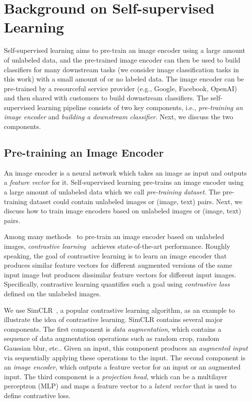 \section{Background on Self-supervised Learning}
\label{sec:background}
Self-supervised learning aims to pre-train an image encoder using a large amount of unlabeled data, and the pre-trained image encoder can then be used to build  classifiers for many downstream tasks (we consider image classification tasks in this work) with a small amount of or no labeled data. 
The image encoder can be pre-trained by a  resourceful service provider (e.g., Google, Facebook, OpenAI) and then shared with customers to build downstream classifiers. 
The self-supervised learning pipeline consists of two key components, i.e., \emph{pre-training an image encoder} and \emph{building a downstream classifier}. Next, we discuss the two components. 



\subsection{Pre-training an Image Encoder} An image encoder is  a neural network which takes an image as input and outputs a \emph{feature vector} for it. Self-supervised learning pre-trains an image encoder using a large amount of unlabeled data which we call \emph{pre-training dataset}. The pre-training dataset could contain unlabeled images or  (image, text) pairs. Next, we discuss how to train image encoders based on unlabeled images or  (image, text) pairs.



 Among many methods~\cite{hadsell2006dimensionality,pathak2016context,noroozi2016unsupervised,he2020momentum,chen2020simple,hjelm2018learning,grill2020bootstrap} to pre-train an image encoder based on unlabeled images, \emph{contrastive learning}~\cite{hadsell2006dimensionality,he2020momentum,chen2020simple,hjelm2018learning,grill2020bootstrap} achieves state-of-the-art performance. Roughly speaking, the goal of contrastive learning is to learn an image encoder  that  produces similar feature vectors for different augmented versions of the same input image but produces dissimilar feature vectors for different input images. Specifically, contrastive learning quantifies such a goal using \emph{contrastive loss} defined on the unlabeled images. 



We use SimCLR~\cite{chen2020simple}, a popular contrastive learning algorithm, as an example to illustrate the idea of contrastive learning. SimCLR contains several major components. The first component is \emph{data augmentation}, which contains a sequence of data augmentation operations such as random crop, random Gaussian blur, etc.. Given an input, this component produces an \emph{augmented input} via sequentially applying these operations to the input. The second component is an \emph{image encoder}, which outputs a feature vector for an input or an augmented input. The third component is a \emph{projection head}, which can be a multilayer perceptron (MLP) and maps a feature vector to a \emph{latent vector} that is used to define contrastive loss. 

